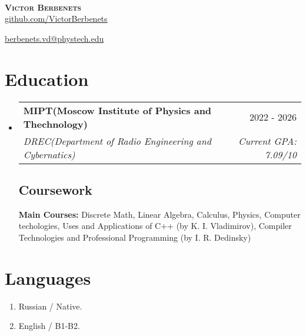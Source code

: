 \documentclass[letterpaper,11pt]{article}
\makeatletter
\newcommand{\resumeSubheading}[4]{
  \vspace{-2pt}\item
    \begin{tabular*}{0.97\textwidth}[t]{l@{\extracolsep{\fill}}r}
      \textbf{#1} & #2 \\
      \textit{\small#3} & \textit{\small #4} \\
    \end{tabular*}\vspace{-7pt}
}
\newcommand{\resumeSubHeadingListStart}{\begin{itemize}[leftmargin=0.15in, label={}]}
\newcommand{\resumeSubHeadingListEnd}{\end{itemize}}
\makeatother
\begin{document}
\
\vspace{+5pt}

\begin{center}
    \textbf{\Huge \scshape Victor Berbenets} \\ \vspace{8pt}
    \small 
    \href{https://github.com/VictorBerbenets}{\underline{github.com/VictorBerbenets}} $  $

    {\underline{berbenets.vd@phystech.edu}}
\end{center}

\section{Education}
  \resumeSubHeadingListStart
  
    \resumeSubheading
      {MIPT(Moscow Institute of Physics and Thechnology)}{2022 - 2026}
      {DREC(Department of Radio Engineering and Cybernatics)}{Current GPA: 7.09/10}
      

    \vspace{+10pt}

    \subsection{Coursework}
      \textbf{Main Courses:} Discrete Math, Linear Algebra, Calculus, Physics, Computer techologies, Uses and Applications of C++ (by K. I. Vladimirov), Compiler Technologies and Professional Programming (by I. R. Dedinsky)\\


  \resumeSubHeadingListEnd
\section{Languages}
 \begin{itemize}[leftmargin=0.15in, label={}]
    \begin{enumerate}
        \item Russian / Native.
        \item English / B1-B2.
    \end{enumerate}
 \end{itemize}
\end{document}
